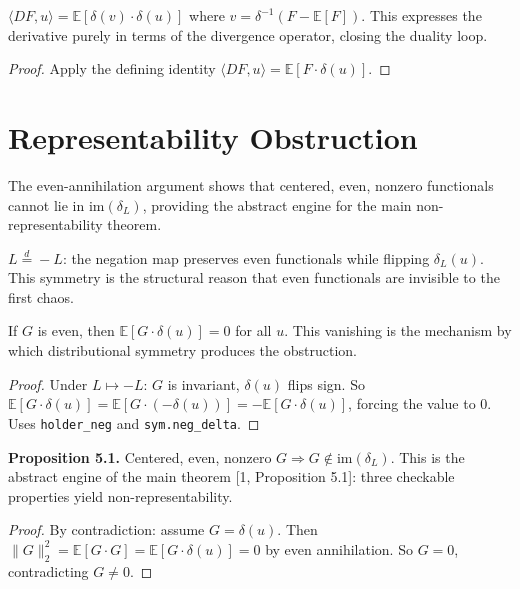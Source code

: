 \begin{theorem}\label{thm:duality_recovery}
\leanok
{}
$\langle DF, u \rangle = \mathbb{E}[\delta(v) \cdot \delta(u)]$ where $v = \delta^{-1}(F - \mathbb{E}[F])$.
This expresses the derivative purely in terms of the divergence operator, closing the duality loop.
\end{theorem}
\begin{proof}\leanok Apply the defining identity $\langle DF, u \rangle = \mathbb{E}[F \cdot \delta(u)]$.\end{proof}

\section{Representability Obstruction}

The even-annihilation argument shows that centered, even, nonzero functionals cannot lie in $\mathrm{im}(\delta_L)$, providing the abstract engine for the main non-representability theorem.

\begin{defn}\label{def:dist_sym}
\leanok
{}
$L \stackrel{d}{=} -L$: the negation map preserves even functionals while flipping $\delta_L(u)$.
This symmetry is the structural reason that even functionals are invisible to the first chaos.
\end{defn}

\begin{theorem}\label{thm:even_annihilates}
\leanok
{}
If $G$ is even, then $\mathbb{E}[G \cdot \delta(u)] = 0$ for all $u$.
This vanishing is the mechanism by which distributional symmetry produces the obstruction.
\end{theorem}
\begin{proof}\leanok Under $L \mapsto -L$: $G$ is invariant, $\delta(u)$ flips sign. So $\mathbb{E}[G \cdot \delta(u)] = \mathbb{E}[G \cdot (-\delta(u))] = -\mathbb{E}[G \cdot \delta(u)]$, forcing the value to $0$. Uses \texttt{holder\_neg} and \texttt{sym.neg\_delta}.\end{proof}

\begin{theorem}\label{thm:obstruction}
\leanok
{}
\textbf{Proposition 5.1.} Centered, even, nonzero $G \Rightarrow G \notin \mathrm{im}(\delta_L)$.
This is the abstract engine of the main theorem [1, Proposition 5.1]: three checkable properties yield non-representability.
\end{theorem}
\begin{proof}\leanok By contradiction: assume $G = \delta(u)$. Then $\|G\|_2^2 = \mathbb{E}[G \cdot G] = \mathbb{E}[G \cdot \delta(u)] = 0$ by even annihilation. So $G = 0$, contradicting $G \neq 0$.\end{proof}

